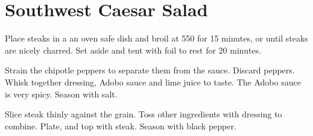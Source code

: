 \section{Southwest Caesar Salad}
\begin{recipe}



Place steaks in a an oven safe dish and broil at 550\degree{} for 15 minutes, or until steaks are nicely charred. Set aside and tent with foil to rest for 20 minutes.


Strain the chipotle peppers to separate them from the sauce. Discard peppers. Whisk together dressing, Adobo sauce and lime juice to taste. The Adobo sauce is very spicy. Season with salt.


Slice steak thinly against the grain. Toss other ingredients with dressing to combine. Plate, and top with steak. Season with black pepper.


\end{recipe}
